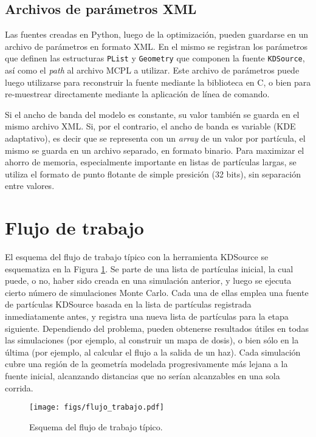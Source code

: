 \subsection{Archivos de parámetros XML}

Las fuentes creadas en Python, luego de la optimización, pueden guardarse en un archivo de parámetros en formato XML. En el mismo se registran los parámetros que definen las estructuras \verb|PList| y \verb|Geometry| que componen la fuente \verb|KDSource|, así como el \emph{path} al archivo MCPL a utilizar. Este archivo de parámetros puede luego utilizarse para reconstruir la fuente mediante la biblioteca en C, o bien para re-muestrear directamente mediante la aplicación de línea de comando.

Si el ancho de banda del modelo es constante, su valor también se guarda en el mismo archivo XML. Si, por el contrario, el ancho de banda es variable (KDE adaptativo), es decir que se representa con un \emph{array} de un valor por partícula, el mismo se guarda en un archivo separado, en formato binario. Para maximizar el ahorro de memoria, especialmente importante en listas de partículas largas, se utiliza el formato de punto flotante de simple presición (32 bits), sin separación entre valores.


\section{Flujo de trabajo}
\label{sec:FT}

El esquema del flujo de trabajo típico con la herramienta KDSource se esquematiza en la Figura \ref{fig:flujo}. Se parte de una lista de partículas inicial, la cual puede, o no, haber sido creada en una simulación anterior, y luego se ejecuta cierto número de simulaciones Monte Carlo. Cada una de ellas emplea una fuente de partículas KDSource basada en la lista de partículas registrada inmediatamente antes, y registra una nueva lista de partículas para la etapa siguiente. Dependiendo del problema, pueden obtenerse resultados útiles en todas las simulaciones (por ejemplo, al construir un mapa de dosis), o bien sólo en la última (por ejemplo, al calcular el flujo a la salida de un haz). Cada simulación cubre una región de la geometría modelada progresivamente más lejana a la fuente inicial, alcanzando distancias que no serían alcanzables en una sola corrida.

\begin{figure}[b!]
	\centering
	\texttt{[image: figs/flujo\_trabajo.pdf]}
	\caption{Esquema del flujo de trabajo típico.}
	\label{fig:flujo}
\end{figure}

